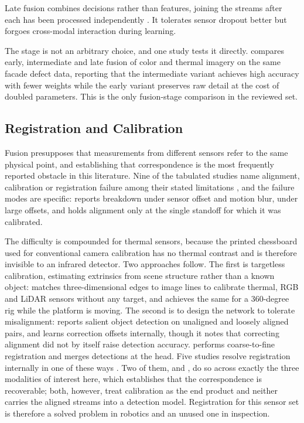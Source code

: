 Late fusion combines decisions rather than features, joining the streams after
each has been processed independently \citep{Lin2022,Shahsavarani2024,Tran2024}. It tolerates sensor
dropout better but forgoes cross-modal interaction during learning.

The stage is not an arbitrary choice, and one study tests it directly.
\citet{Yang2023} compares early, intermediate and late fusion of color and
thermal imagery on the same facade defect data, reporting that the intermediate
variant achieves high accuracy with fewer weights while the early variant
preserves raw detail at the cost of doubled parameters. This is the only
fusion-stage comparison in the reviewed set.

\subsection{Registration and Calibration}

Fusion presupposes that measurements from different sensors refer to the same
physical point, and establishing that correspondence is the most frequently
reported obstacle in this literature. Nine of the tabulated studies name
alignment, calibration or registration failure among their stated limitations
\citep{Cheng2025,Liu2025,Zhu2026,Xu2026,Cao2026,Nooralishahi2022,Shahsavarani2024,Bin2023,Yang2024},
and the failure modes are specific: \citet{Zhu2026} reports breakdown under
sensor offset and motion blur, \citet{Xu2026} under large offsets, and
\citet{Nooralishahi2022} holds alignment only at the single standoff for which it was
calibrated.

The difficulty is compounded for thermal sensors, because the printed
chessboard used for conventional camera calibration has no thermal contrast and
is therefore invisible to an infrared detector. Two approaches follow. The first
is targetless calibration, estimating extrinsics from scene structure rather
than a known object: \citet{Yang2024} matches three-dimensional edges to image
lines to calibrate thermal, RGB and LiDAR sensors without any target, and
\citet{Tran2024} achieves the same for a 360-degree rig while the platform is
moving. The second is to design the network to tolerate misalignment:
\citet{Wang2024} reports salient object detection on unaligned and loosely aligned
pairs, and \citet{Liu2025} learns correction offsets internally, though it notes
that correcting alignment did not by itself raise detection accuracy.
\citet{Li2024c} performs coarse-to-fine registration and merges detections at the
head. Five studies resolve registration internally in one of these ways
\citep{Yang2024,Tran2024,Wang2024,Liu2025,Li2024c}. Two of them,
\citet{Yang2024} and \citet{Tran2024}, do so across exactly the three
modalities of interest here, which establishes that the correspondence is
recoverable; both, however, treat calibration as the end product and neither
carries the aligned streams into a detection model. Registration for this
sensor set is therefore a solved problem in robotics and an unused one in
inspection.

